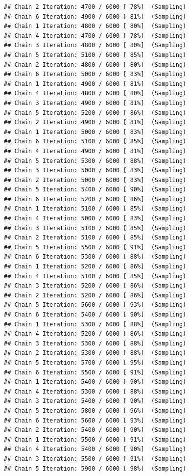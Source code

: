 \documentclass[
]{article}
\begin{document}
\begin{verbatim}
## Chain 2 Iteration: 4700 / 6000 [ 78%]  (Sampling) 
## Chain 6 Iteration: 4900 / 6000 [ 81%]  (Sampling) 
## Chain 1 Iteration: 4800 / 6000 [ 80%]  (Sampling) 
## Chain 4 Iteration: 4700 / 6000 [ 78%]  (Sampling) 
## Chain 3 Iteration: 4800 / 6000 [ 80%]  (Sampling) 
## Chain 5 Iteration: 5100 / 6000 [ 85%]  (Sampling) 
## Chain 2 Iteration: 4800 / 6000 [ 80%]  (Sampling) 
## Chain 6 Iteration: 5000 / 6000 [ 83%]  (Sampling) 
## Chain 1 Iteration: 4900 / 6000 [ 81%]  (Sampling) 
## Chain 4 Iteration: 4800 / 6000 [ 80%]  (Sampling) 
## Chain 3 Iteration: 4900 / 6000 [ 81%]  (Sampling) 
## Chain 5 Iteration: 5200 / 6000 [ 86%]  (Sampling) 
## Chain 2 Iteration: 4900 / 6000 [ 81%]  (Sampling) 
## Chain 1 Iteration: 5000 / 6000 [ 83%]  (Sampling) 
## Chain 6 Iteration: 5100 / 6000 [ 85%]  (Sampling) 
## Chain 4 Iteration: 4900 / 6000 [ 81%]  (Sampling) 
## Chain 5 Iteration: 5300 / 6000 [ 88%]  (Sampling) 
## Chain 3 Iteration: 5000 / 6000 [ 83%]  (Sampling) 
## Chain 2 Iteration: 5000 / 6000 [ 83%]  (Sampling) 
## Chain 5 Iteration: 5400 / 6000 [ 90%]  (Sampling) 
## Chain 6 Iteration: 5200 / 6000 [ 86%]  (Sampling) 
## Chain 1 Iteration: 5100 / 6000 [ 85%]  (Sampling) 
## Chain 4 Iteration: 5000 / 6000 [ 83%]  (Sampling) 
## Chain 3 Iteration: 5100 / 6000 [ 85%]  (Sampling) 
## Chain 2 Iteration: 5100 / 6000 [ 85%]  (Sampling) 
## Chain 5 Iteration: 5500 / 6000 [ 91%]  (Sampling) 
## Chain 6 Iteration: 5300 / 6000 [ 88%]  (Sampling) 
## Chain 1 Iteration: 5200 / 6000 [ 86%]  (Sampling) 
## Chain 4 Iteration: 5100 / 6000 [ 85%]  (Sampling) 
## Chain 3 Iteration: 5200 / 6000 [ 86%]  (Sampling) 
## Chain 2 Iteration: 5200 / 6000 [ 86%]  (Sampling) 
## Chain 5 Iteration: 5600 / 6000 [ 93%]  (Sampling) 
## Chain 6 Iteration: 5400 / 6000 [ 90%]  (Sampling) 
## Chain 1 Iteration: 5300 / 6000 [ 88%]  (Sampling) 
## Chain 4 Iteration: 5200 / 6000 [ 86%]  (Sampling) 
## Chain 3 Iteration: 5300 / 6000 [ 88%]  (Sampling) 
## Chain 2 Iteration: 5300 / 6000 [ 88%]  (Sampling) 
## Chain 5 Iteration: 5700 / 6000 [ 95%]  (Sampling) 
## Chain 6 Iteration: 5500 / 6000 [ 91%]  (Sampling) 
## Chain 1 Iteration: 5400 / 6000 [ 90%]  (Sampling) 
## Chain 4 Iteration: 5300 / 6000 [ 88%]  (Sampling) 
## Chain 3 Iteration: 5400 / 6000 [ 90%]  (Sampling) 
## Chain 5 Iteration: 5800 / 6000 [ 96%]  (Sampling) 
## Chain 6 Iteration: 5600 / 6000 [ 93%]  (Sampling) 
## Chain 2 Iteration: 5400 / 6000 [ 90%]  (Sampling) 
## Chain 1 Iteration: 5500 / 6000 [ 91%]  (Sampling) 
## Chain 4 Iteration: 5400 / 6000 [ 90%]  (Sampling) 
## Chain 3 Iteration: 5500 / 6000 [ 91%]  (Sampling) 
## Chain 5 Iteration: 5900 / 6000 [ 98%]  (Sampling) 

\end{verbatim}
\end{document}
